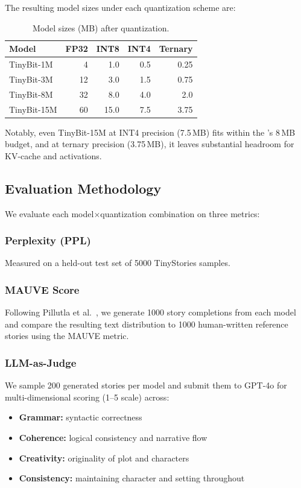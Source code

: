 \noindent The resulting model sizes under each quantization scheme are:

\begin{table}[H]
\centering
\caption{Model sizes (MB) after quantization.}
\label{tab:quantized_sizes}
\small
\begin{tabular}{lrrrr}
\toprule
\textbf{Model} & \textbf{FP32} & \textbf{INT8} & \textbf{INT4} & \textbf{Ternary} \\
\midrule
TinyBit-1M  & 4    & 1.0  & 0.5  & 0.25 \\
TinyBit-3M  & 12   & 3.0  & 1.5  & 0.75 \\
TinyBit-8M  & 32   & 8.0  & 4.0  & 2.0  \\
TinyBit-15M & 60   & 15.0 & 7.5  & 3.75 \\
\bottomrule
\end{tabular}
\end{table}

\noindent Notably, even TinyBit-15M at INT4 precision (7.5\,MB) fits within
the \espss{}'s 8\,MB \psram{} budget, and at ternary precision (3.75\,MB),
it leaves substantial headroom for KV-cache and activations.

\subsection{Evaluation Methodology}

We evaluate each model$\times$quantization combination on three metrics:

\subsubsection{Perplexity (PPL)}
Measured on a held-out test set of 5000 TinyStories samples.

\subsubsection{MAUVE Score}
Following Pillutla et al.~\cite{pillutla2021mauve}, we generate 1000 story
completions from each model and compare the resulting text distribution to
1000 human-written reference stories using the MAUVE metric.

\subsubsection{LLM-as-Judge}
We sample 200 generated stories per model and submit them to GPT-4o for
multi-dimensional scoring (1--5 scale) across:
\begin{itemize}[leftmargin=*,topsep=2pt,itemsep=1pt]
  \item \textbf{Grammar:} syntactic correctness
  \item \textbf{Coherence:} logical consistency and narrative flow
  \item \textbf{Creativity:} originality of plot and characters
  \item \textbf{Consistency:} maintaining character and setting throughout
\end{itemize}

